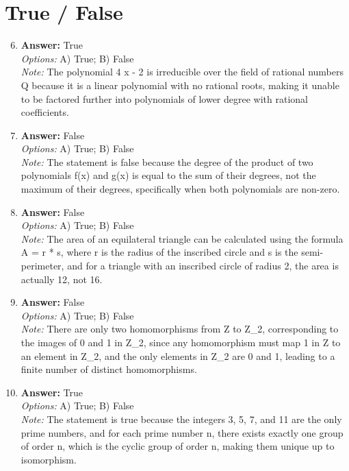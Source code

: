 \documentclass[12pt]{article}
\begin{document}
\section*{True / False}
\begin{enumerate}[label=\arabic*.]
\setcounter{enumi}{5}
\item \textbf{Answer:} True
\\ \textit{Options:} A) True; B) False
\\ \textit{Note:} The polynomial 4 x - 2 is irreducible over the field of rational numbers Q because it is a linear polynomial with no rational roots, making it unable to be factored further into polynomials of lower degree with rational coefficients.
\item \textbf{Answer:} False
\\ \textit{Options:} A) True; B) False
\\ \textit{Note:} The statement is false because the degree of the product of two polynomials f(x) and g(x) is equal to the sum of their degrees, not the maximum of their degrees, specifically when both polynomials are non-zero.
\item \textbf{Answer:} False
\\ \textit{Options:} A) True; B) False
\\ \textit{Note:} The area of an equilateral triangle can be calculated using the formula A = r * s, where r is the radius of the inscribed circle and s is the semi-perimeter, and for a triangle with an inscribed circle of radius 2, the area is actually 12, not 16.
\item \textbf{Answer:} False
\\ \textit{Options:} A) True; B) False
\\ \textit{Note:} There are only two homomorphisms from Z to Z\_2, corresponding to the images of 0 and 1 in Z\_2, since any homomorphism must map 1 in Z to an element in Z\_2, and the only elements in Z\_2 are 0 and 1, leading to a finite number of distinct homomorphisms.
\item \textbf{Answer:} True
\\ \textit{Options:} A) True; B) False
\\ \textit{Note:} The statement is true because the integers 3, 5, 7, and 11 are the only prime numbers, and for each prime number n, there exists exactly one group of order n, which is the cyclic group of order n, making them unique up to isomorphism.
\end{enumerate}
\end{document}
